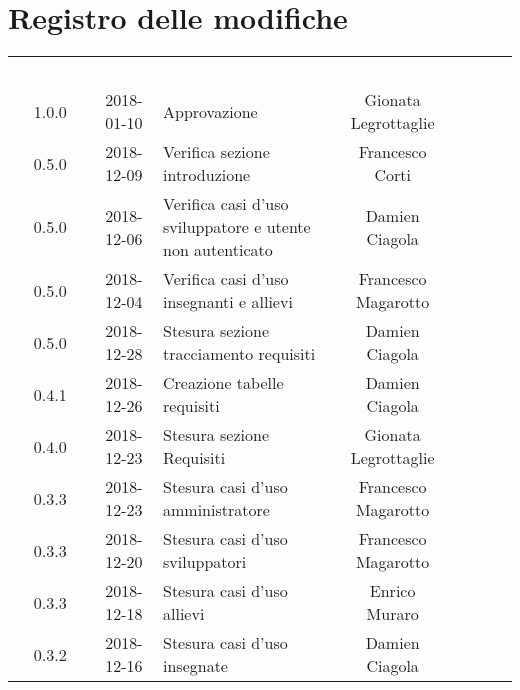 \section*{Registro delle modifiche}
{
	\renewcommand{\arraystretch}{1.5}
	\centering
	\begin{longtable}{ c c C{6cm} c c }
		\textcolor{white}{\textbf{Versione}} & \textcolor{white}{\textbf{Data}} & \textcolor{white}{\textbf{Descrizione}} & \textcolor{white}{\textbf{Autore}} & \textcolor{white}{\textbf{Ruolo}}\\

		1.0.0 &
		2018-01-10 &
		Approvazione &	
		Gionata Legrottaglie&	
		\Res{} \\
		
		0.5.0 & 2018-12-09 &  
		Verifica sezione introduzione &	
		Francesco Corti&	
		\ver{} \\
		
		0.5.0 & 
		2018-12-06 &  
		Verifica casi d'uso sviluppatore e utente non autenticato& 	
		Damien Ciagola  &	
		\ver{} \\
		
		0.5.0 & 
		2018-12-04 &  
		Verifica casi d'uso insegnanti e allievi & 
		Francesco Magarotto  &
		\ver{}  \\
		
		0.5.0 & 
		2018-12-28 &  
		Stesura sezione tracciamento requisiti &	
		Damien Ciagola &	
		\ana{} \\
		
		0.4.1 & 
		2018-12-26 &  
		Creazione tabelle requisiti&	
		Damien Ciagola &	
		\ana{} \\
		
		0.4.0 & 
		2018-12-23 &  
		Stesura sezione Requisiti &	
		Gionata Legrottaglie &	
		\ana{} \\
		
		0.3.3 & 
		2018-12-23 &  
		Stesura casi d'uso amministratore &	
		Francesco Magarotto &	
		\ana{} \\
		
		0.3.3 & 
		2018-12-20 &  
		Stesura casi d'uso sviluppatori &	
		Francesco Magarotto &	
		\ana{} \\
		
		0.3.3 & 
		2018-12-18 &  
		Stesura casi d'uso allievi &	
		Enrico Muraro	&	
		\ana{} \\
		
		0.3.2 & 
		2018-12-16 &  
		Stesura casi d'uso insegnate &	
		Damien Ciagola &	
		\ana{} \\	
		

\end{longtable}}
